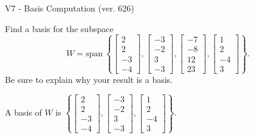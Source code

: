 \begin{exercise}
  \begin{exerciseTitle}V7 - Basis Computation (ver. 626)\end{exerciseTitle}
  \begin{exerciseStatement}
    Find a basis for the subspace 
\[W=\mathrm{span}\ \left\{\left[\begin{array}{r}
2 \\
2 \\
-3 \\
-4
\end{array}\right] , \left[\begin{array}{r}
-3 \\
-2 \\
3 \\
-3
\end{array}\right] , \left[\begin{array}{r}
-7 \\
-8 \\
12 \\
23
\end{array}\right] , \left[\begin{array}{r}
1 \\
2 \\
-4 \\
3
\end{array}\right]\right\}.\]
 Be sure to explain why your result is a basis.


  \end{exerciseStatement}
  \begin{exerciseAnswer}
   A basis of \(W\) is  \(\left\{\left[\begin{array}{r}
2 \\
2 \\
-3 \\
-4
\end{array}\right] , \left[\begin{array}{r}
-3 \\
-2 \\
3 \\
-3
\end{array}\right] , \left[\begin{array}{r}
1 \\
2 \\
-4 \\
3
\end{array}\right]\right\}\).
  


  \end{exerciseAnswer}
\end{exercise}